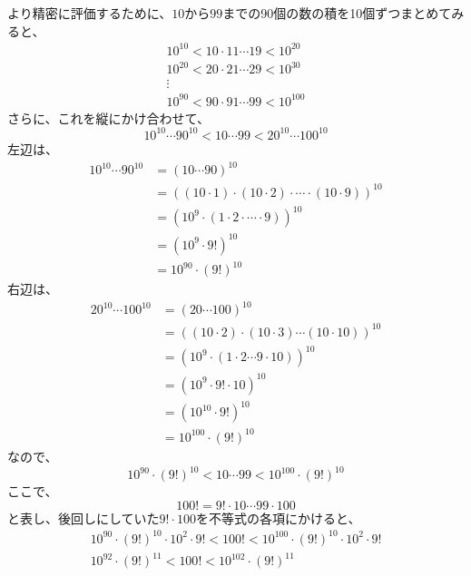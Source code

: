 \documentclass[b5paper,17pt,twocolumn]{jsarticle}
\begin{document}
より精密に評価するために、$10$から$99$までの90個の数の積を10個ずつまとめてみると、
\begin{gather}
  10^{10} < 10 \cdot 11 \cdots 19 < 10^{20}  \\
  10^{20} < 20 \cdot 21 \cdots 29 < 10^{30}  \\
  \vdots                                     \\
  10^{90} < 90 \cdot 91 \cdots 99 < 10^{100}
\end{gather}
さらに、これを縦にかけ合わせて、
\begin{equation}
  10^{10} \cdots 90^{10} < 10 \cdots 99 < 20^{10} \cdots 100^{10}
\end{equation}
左辺は、
\begin{align}
  10^{10} \cdots 90^{10} & = (10\cdots 90)^{10}                                                                  \\
                         & = \left( (10 \cdot 1) \cdot (10 \cdot 2) \cdot \cdots \cdot (10 \cdot 9) \right)^{10} \\
                         & = \left( 10^9 \cdot (1 \cdot 2 \cdot \cdots \cdot 9) \right)^{10}                     \\
                         & = \left( 10^9 \cdot 9! \right)^{10}                                                   \\
                         & = 10^{90} \cdot (9!)^{10}
\end{align}
右辺は、
\begin{align}
  20^{10} \cdots 100^{10} & = (20\cdots 100)^{10}                                                      \\
                          & = \left( (10 \cdot 2) \cdot (10 \cdot 3) \cdots (10 \cdot 10) \right)^{10} \\
                          & = \left( 10^{9} \cdot (1 \cdot 2 \cdots 9 \cdot 10) \right)^{10}           \\
                          & = \left( 10^{9} \cdot 9! \cdot 10 \right)^{10}                             \\
                          & = \left( 10^{10} \cdot 9! \right)^{10}                                     \\
                          & = 10^{100} \cdot (9!)^{10}
\end{align}
なので、
\begin{equation}
  10^{90} \cdot (9!)^{10} < 10 \cdots 99 < 10^{100} \cdot (9!)^{10}
\end{equation}
ここで、
\begin{equation}
  100! = 9! \cdot 10 \cdots 99 \cdot 100
\end{equation}
と表し、後回しにしていた$9! \cdot 100$を不等式の各項にかけると、
\begin{gather}
  10^{90} \cdot (9!)^{10} \cdot 10^{2} \cdot 9! < 100! < 10^{100} \cdot (9!)^{10} \cdot 10^{2} \cdot 9! \\
  10^{92} \cdot (9!)^{11} < 100! < 10^{102} \cdot (9!)^{11}
\end{gather}
\end{document}
